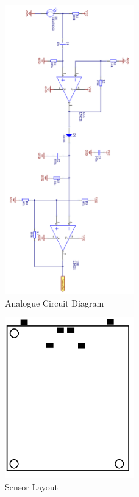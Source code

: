 \documentclass{article}
\begin{document}
\begin{figure}[!h]
\centerline{\includegraphics[width=0.5\textwidth]{circuit}}
\caption{Analogue Circuit Diagram}
\label{fig:circuit}
\end{figure}

\begin{figure}[!h]
\centerline{\includegraphics[width=0.5\textwidth]{sensor_layout}}
\caption{Sensor Layout}
\label{fig:senslay}
\end{figure}
\end{document}
